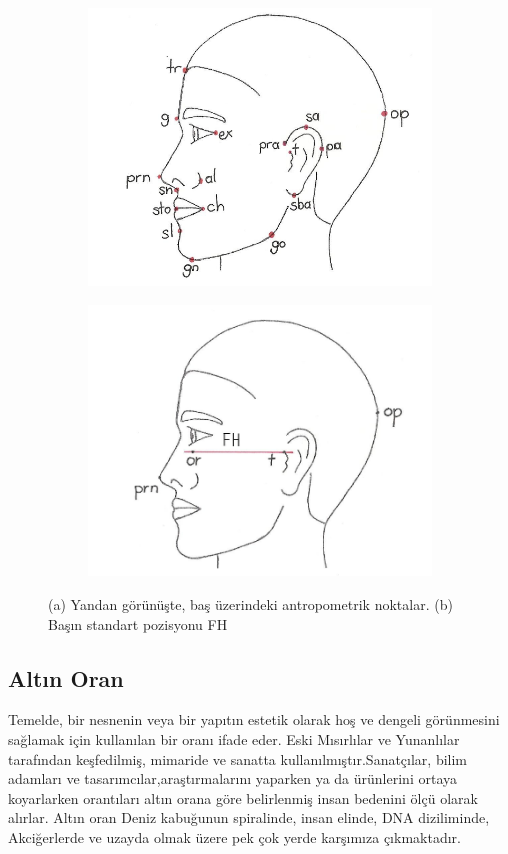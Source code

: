 \documentclass[12pt, a4paper]{article}
\begin{document}
\begin{figure}[h!]
	\centering
	\begin{subfigure}[b]{0.4\linewidth}
		\includegraphics[width=5 cm, height=5 cm]{yan.png}
		\caption{}
	\end{subfigure}
	\begin{subfigure}[b]{0.4\linewidth}
		\includegraphics[width=5 cm , height=5 cm]{fh.png}
		\caption{}
	\end{subfigure}
	\caption{ (a) Yandan görünüşte, baş üzerindeki antropometrik noktalar. (b)  Başın standart pozisyonu FH}
\end{figure}

\subsection{Altın Oran}
Temelde, bir nesnenin veya bir yapıtın estetik olarak hoş ve dengeli görünmesini sağlamak için kullanılan bir oranı ifade eder. Eski Mısırlılar ve Yunanlılar
tarafından keşfedilmiş, mimaride ve sanatta kullanılmıştır.Sanatçılar, bilim adamları ve tasarımcılar,araştırmalarını yaparken ya da ürünlerini ortaya
koyarlarken orantıları altın orana göre belirlenmiş insan bedenini ölçü olarak alırlar.
Altın oran Deniz kabuğunun spiralinde, insan elinde, DNA diziliminde, Akciğerlerde ve uzayda olmak üzere pek çok yerde karşımıza çıkmaktadır.\newline

\end{document}
